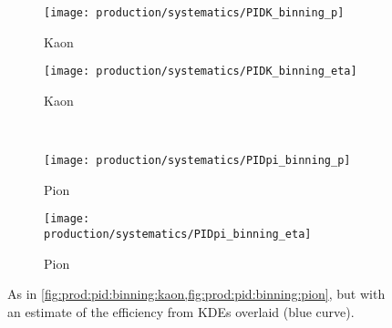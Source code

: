 \begin{figure}
  \begin{subfigure}{0.5\textwidth}
    \centering
    \texttt{[image: production/systematics/PIDK\_binning\_p]}
    \caption{Kaon \ptot}
    \label{fig:prod:syst:pid:kde_1d_binning:kaon_p}
  \end{subfigure}
  \begin{subfigure}{0.5\textwidth}
    \centering
    \texttt{[image: production/systematics/PIDK\_binning\_eta]}
    \caption{Kaon \Eta}
    \label{fig:prod:syst:pid:kde_1d_binning:kaon_eta}
  \end{subfigure}
  \\[0.5cm]
  \begin{subfigure}{0.5\textwidth}
    \centering
    \texttt{[image: production/systematics/PIDpi\_binning\_p]}
    \caption{Pion \ptot}
    \label{fig:prod:syst:pid:kde_1d_binning:pion_p}
  \end{subfigure}
  \begin{subfigure}{0.5\textwidth}
    \centering
    \texttt{[image: production/systematics/PIDpi\_binning\_eta]}
    \caption{Pion \Eta}
    \label{fig:prod:syst:pid:kde_1d_binning:pion_eta}
  \end{subfigure}

  \caption{%
    As in \cref{fig:prod:pid:binning:kaon,fig:prod:pid:binning:pion}, but with
    an estimate of the efficiency from \aclp{KDE} overlaid (blue curve).
  }
  \label{fig:prod:syst:pid:kde_1d_binning}
\end{figure}

